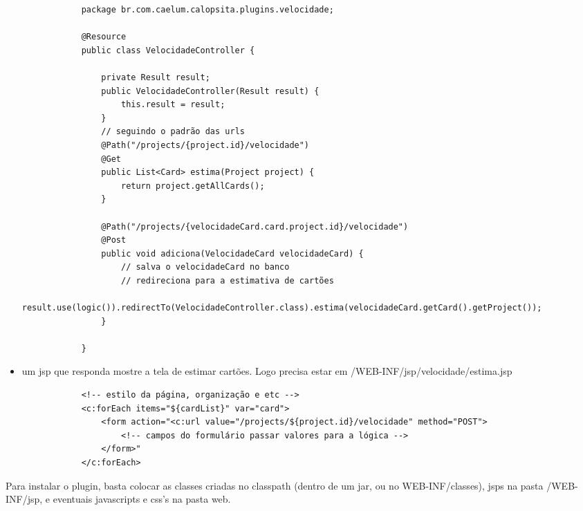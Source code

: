 \begin{itemize}
{		\begin{lstlisting}
			package br.com.caelum.calopsita.plugins.velocidade;
			
			@Resource
			public class VelocidadeController {
				
				private Result result;
				public VelocidadeController(Result result) {
					this.result = result;
				}
				// seguindo o padrão das urls
				@Path("/projects/{project.id}/velocidade")
				@Get
				public List<Card> estima(Project project) {
					return project.getAllCards();
				}
	
				@Path("/projects/{velocidadeCard.card.project.id}/velocidade")
				@Post
				public void adiciona(VelocidadeCard velocidadeCard) {
					// salva o velocidadeCard no banco
					// redireciona para a estimativa de cartões
					result.use(logic()).redirectTo(VelocidadeController.class).estima(velocidadeCard.getCard().getProject());
				}
				
			}
		\end{lstlisting}
	}
	
	\item{um jsp que responda mostre a tela de estimar cartões. Logo precisa estar em /WEB-INF/jsp/velocidade/estima.jsp
		\begin{verbatim}
			<!-- estilo da página, organização e etc -->
			<c:forEach items="${cardList}" var="card">
				<form action="<c:url value="/projects/${project.id}/velocidade" method="POST">
					<!-- campos do formulário passar valores para a lógica -->
				</form>"
			</c:forEach>
		\end{verbatim}
	}
\end{itemize}

Para instalar o plugin, basta colocar as classes criadas no classpath (dentro de um jar, ou no WEB-INF/classes),
jsps na pasta /WEB-INF/jsp, e eventuais javascripts e css's na pasta web.



